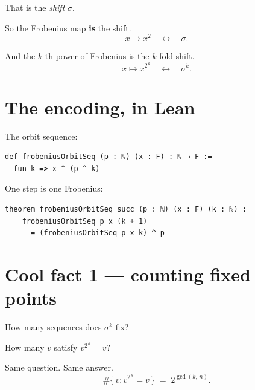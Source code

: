 \documentclass[11pt]{article}
\begin{document}
\bigskip

That is the \emph{shift} $\sigma$.

\bigskip

So the Frobenius map \textbf{is} the shift.
\[
  x \mapsto x^{2} \quad\longleftrightarrow\quad \sigma .
\]

\bigskip

And the $k$-th power of Frobenius is the $k$-fold shift.
\[
  x \mapsto x^{2^{\,k}} \quad\longleftrightarrow\quad \sigma^{k}.
\]

\bigskip


\newpage


\section{The encoding, in Lean}

\bigskip

The orbit sequence:

\begin{lstlisting}
def frobeniusOrbitSeq (p : ℕ) (x : F) : ℕ → F :=
  fun k => x ^ (p ^ k)
\end{lstlisting}

\bigskip

One step is one Frobenius:

\begin{lstlisting}
theorem frobeniusOrbitSeq_succ (p : ℕ) (x : F) (k : ℕ) :
    frobeniusOrbitSeq p x (k + 1)
      = (frobeniusOrbitSeq p x k) ^ p
\end{lstlisting}

\bigskip


\newpage


\section{Cool fact 1 --- counting fixed points}

\bigskip

How many sequences does $\sigma^{k}$ fix?

\bigskip

How many $v$ satisfy $v^{2^{\,k}} = v$?

\bigskip

Same question. Same answer.
\[
  \#\{\, v : v^{2^{\,k}} = v \,\} \;=\; 2^{\gcd(k,\,n)} .
\]
\end{document}
